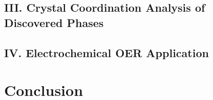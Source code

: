 \documentclass[%
  journal=cmatex,  %
  manuscript=article,
  ]{achemso}
\begin{document}
  \subsection{III. Crystal Coordination Analysis of Discovered Phases}
  

  \subsection{IV. Electrochemical OER Application}
  

\section{Conclusion}


\begin{acknowledgement}

\end{acknowledgement}



\clearpage
\renewcommand{\thefigure}{S\arabic{figure}}
\setcounter{figure}{0}
\renewcommand{\thetable}{S\arabic{table}}
\setcounter{table}{0}

\begin{suppinfo}

\end{suppinfo}



\end{document}
